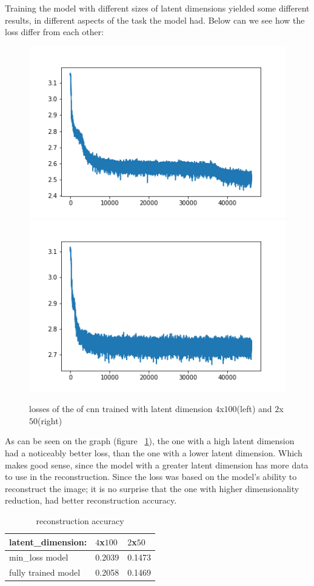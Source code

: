 Training the model with different sizes of latent dimensions yielded some different results, in different aspects of the task the model had. Below can we see how the loss differ from each other: \\

\begin{figure}[!ht]
  \centering
  \includegraphics[width=0.4\linewidth]{latex/imgs/CNN_loss_latent_dimension_100.png}
  \includegraphics[width=0.4\linewidth]{latex/imgs/loss_latent_dimension_50.png}
  \caption{losses of the of cnn trained with latent dimension $4$x$100$(left) and $2$x$50$(right)}
  \label{fig:cnn_loss}
\end{figure}

\noindent
As can be seen on the graph (figure ~\ref{fig:cnn_loss}), the one with a high latent dimension had a noticeably better loss, than the one with a lower latent dimension. Which makes good sense, since the model with a greater latent dimension has more data to use in the reconstruction. Since the loss was based on the model's ability to reconstruct the image; it is no surprise that the one with higher dimensionality reduction, had better reconstruction accuracy.

\begin{table}[!ht]
\centering
\begin{tabular}{|l|l|l|}
\hline
 latent\_dimension: & $4$x$100$  &  $2$x$50$ \\ \hline
min\_loss model     & 0.2039 & 0.1473 \\ \hline
fully trained model & 0.2058 & 0.1469 \\ \hline
\end{tabular}
\caption{reconstruction accuracy}
\end{table}

